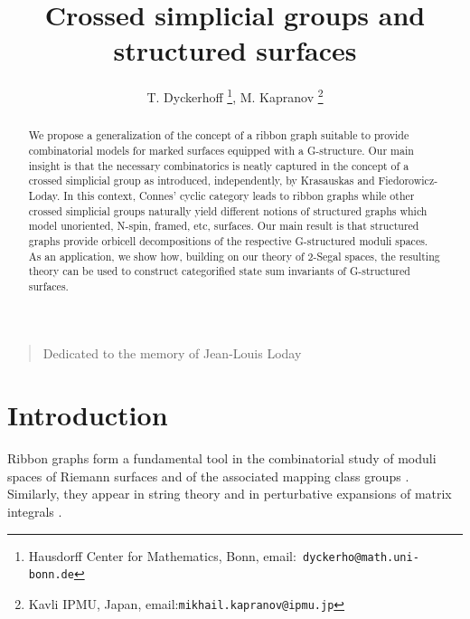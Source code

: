 \documentclass[english,11pt,leqno]{article}
\title{Crossed simplicial groups and structured surfaces}
\author{T. Dyckerhoff \footnote{Hausdorff Center for Mathematics, Bonn, email:{\tt
dyckerho@math.uni-bonn.de}}, M. Kapranov \footnote{Kavli IPMU, Japan, email:{\tt mikhail.kapranov@ipmu.jp}}}
\theoremstyle{definition}
\theoremstyle{remark}
\numberwithin{equation}{section}
\newenvironment{dedication}
        {\vspace{6ex}\begin{quotation}\begin{center}\begin{em}}
        {\par\end{em}\end{center}\end{quotation}\vspace{10ex}}
\begin{document}
\maketitle

\begin{dedication}Dedicated to the memory of Jean-Louis Loday
\end{dedication}

\begin{abstract}
	We propose a generalization of the concept of a ribbon graph suitable to provide
	combinatorial models for marked surfaces equipped with a G-structure. Our main insight is 
	that the necessary combinatorics is neatly captured in the concept of a crossed simplicial group 
	as introduced, independently, by Krasauskas and Fiedorowicz-Loday. In this context, Connes'
	cyclic category leads to ribbon graphs while other crossed simplicial groups naturally yield
	different notions of structured graphs which model unoriented, N-spin, framed, etc,
	surfaces.
	Our main result is that structured graphs provide orbicell decompositions of the respective
	G-structured moduli spaces. As an application, we show how, building on our theory of
	2-Segal spaces, the resulting theory can be used to construct categorified state sum
	invariants of G-structured surfaces.
\end{abstract}

\newpage

\tableofcontents
{}


\section*{Introduction}

Ribbon graphs form a fundamental tool in the combinatorial study of moduli spaces of Riemann
surfaces and of the associated mapping class groups \cite{kontsevich-feynman, penner:book}.
Similarly, they appear in string theory and in perturbative expansions of matrix integrals
\cite{marino}.\\
\end{document}
